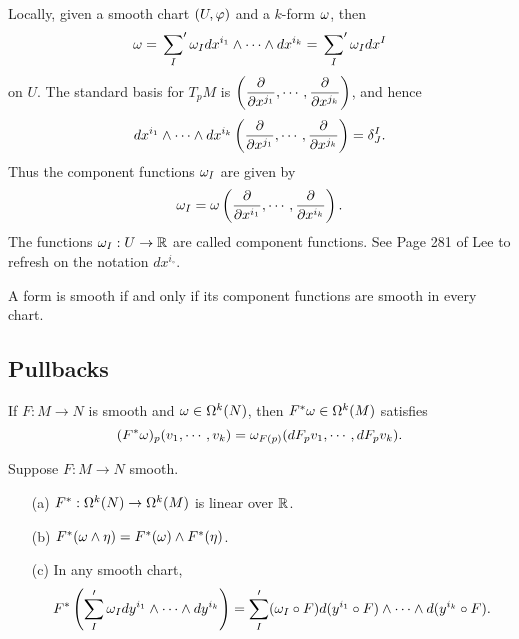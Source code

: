 Locally, given a smooth chart $(U,\varphi)$ and a $k$-form $\omega$, then 
$$\omega = \sideset{}{'}\sum_{I} \omega_I dx^{i_1} \wedge \cdots \wedge dx^{i_k} = 
   \sideset{}{'}\sum_{I} \omega_I dx^I $$ on $U$.
The standard basis for $T_pM$ is $\displaystyle{\left(\pdv{}{x^{j_1}},\cdots,\pdv{}{x^{j_k}}\right) }$, and hence 
$$dx^{i_1} \wedge \cdots \wedge dx^{i_k} \left(\pdv{}{x^{j_1}},\cdots,\pdv{}{x^{j_k}}\right)
  = \delta_J^I. $$
Thus the component functions $\omega_I$ are given by 
$$\omega_I = \omega\left(\pdv{}{x^{i_1}}, \cdots, \pdv{}{x^{i_k}}\right).$$ The functions $\omega_I:U \to \mathbb{R}$ are called component functions. 
See Page 281 of Lee to refresh on the notation $dx^{i_\circ}$. 
\begin{proposition}
    A form is smooth if and only if its component functions are smooth in every chart.     
\end{proposition}
\subsection{Pullbacks}
If $F:M \to N$ is smooth and $\omega \in \Omega^k(N)$, then $F^* \omega
  \in \Omega^k(M)$ satisfies 
$$(F^*\omega)_p(v_1,\cdots,v_k) = \omega_{F(p)}(dF_pv_1,\cdots,dF_pv_k).$$
\begin{lemma}\label{14.16}
    Suppose $F:M \to N$ smooth.
    \begin{enumerate}
    \item[(a)] $F^*:\Omega^k(N) \to \Omega^k(M)$ is linear over $\mathbb{R}$. 
    \item[(b)] $F^*(\omega \wedge \eta) = F^*(\omega) \wedge F^*(\eta)$.
    \item[(c)] In any smooth chart, 
    $$F^*\left(\sum_{I}' \omega_I dy^{i_1} \wedge \cdots \wedge dy^{i_k} \right)
    = \sum_I'(\omega_I \circ F) d(y^{i_1} \circ F) \wedge \cdots \wedge d(y^{i_k} \circ F).$$
    \end{enumerate}
\end{lemma}
